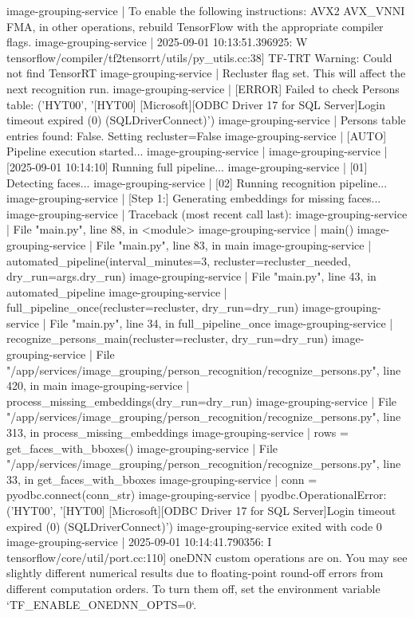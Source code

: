 image-grouping-service  | To enable the following instructions: AVX2 AVX_VNNI FMA, in other operations, rebuild TensorFlow with the appropriate compiler flags.
image-grouping-service  | 2025-09-01 10:13:51.396925: W tensorflow/compiler/tf2tensorrt/utils/py_utils.cc:38] TF-TRT Warning: Could not find TensorRT
image-grouping-service  | Recluster flag set. This will affect the next recognition run.
image-grouping-service  | [ERROR] Failed to check Persons table: ('HYT00', '[HYT00] [Microsoft][ODBC Driver 17 for SQL Server]Login timeout expired (0) (SQLDriverConnect)')
image-grouping-service  | Persons table entries found: False. Setting recluster=False
image-grouping-service  | [AUTO] Pipeline execution started...
image-grouping-service  |
image-grouping-service  | [2025-09-01 10:14:10] Running full pipeline...
image-grouping-service  | [01] Detecting faces...
image-grouping-service  | [02] Running recognition pipeline...
image-grouping-service  | [Step 1:] Generating embeddings for missing faces...
image-grouping-service  | Traceback (most recent call last):
image-grouping-service  |   File "main.py", line 88, in <module>
image-grouping-service  |     main()
image-grouping-service  |   File "main.py", line 83, in main
image-grouping-service  |     automated_pipeline(interval_minutes=3, recluster=recluster_needed, dry_run=args.dry_run)
image-grouping-service  |   File "main.py", line 43, in automated_pipeline
image-grouping-service  |     full_pipeline_once(recluster=recluster, dry_run=dry_run)
image-grouping-service  |   File "main.py", line 34, in full_pipeline_once
image-grouping-service  |     recognize_persons_main(recluster=recluster, dry_run=dry_run)
image-grouping-service  |   File "/app/services/image_grouping/person_recognition/recognize_persons.py", line 420, in main
image-grouping-service  |     process_missing_embeddings(dry_run=dry_run)
image-grouping-service  |   File "/app/services/image_grouping/person_recognition/recognize_persons.py", line 313, in process_missing_embeddings
image-grouping-service  |     rows = get_faces_with_bboxes()
image-grouping-service  |   File "/app/services/image_grouping/person_recognition/recognize_persons.py", line 33, in get_faces_with_bboxes
image-grouping-service  |     conn = pyodbc.connect(conn_str)
image-grouping-service  | pyodbc.OperationalError: ('HYT00', '[HYT00] [Microsoft][ODBC Driver 17 for SQL Server]Login timeout expired (0) (SQLDriverConnect)')
image-grouping-service exited with code 0
image-grouping-service  | 2025-09-01 10:14:41.790356: I tensorflow/core/util/port.cc:110] oneDNN custom operations are on. You may see slightly different numerical results due to floating-point round-off errors from different computation orders. To turn them off, set the environment variable `TF_ENABLE_ONEDNN_OPTS=0`.
